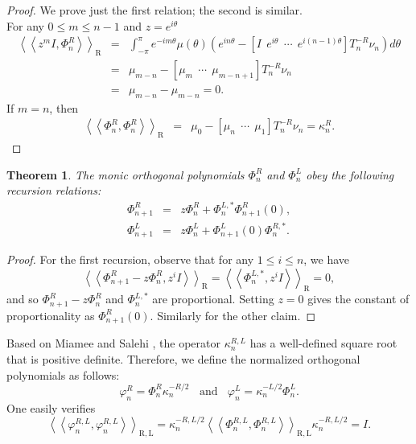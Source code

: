 \documentclass[11pt]{article}
\newtheorem{theorem}{Theorem}[section]
\begin{document}
\begin{proof}
We prove just the first relation; the second is similar.\\
\noindent For any $0 \leq m \leq n-1$ and $z=e^{i\theta}$
\begin{eqnarray*}
\left\langle \left\langle z^{m}I,\Phi_{n}^{R}\right\rangle\right\rangle_{\mathrm{R}} &=& 
\int_{-\pi}^{\pi}e^{-im\theta} \mu(\theta) 
(e^{i n \theta} - 
[I~~e^{i\theta}~~\cdots~~e^{i(n-1)\theta}]T^{-R}_{n}\nu_{n})d\theta\\
&=& \mu_{m-n} - [\mu_{m}~~\cdots~~\mu_{m-n+1}]T^{-R}_{n}\nu_{n}\\
&=& \mu_{m-n} - \mu_{m-n} = 0.
\end{eqnarray*}
If $m=n$, then 
\begin{eqnarray*}
\left\langle \left\langle \Phi_{n}^{R},\Phi_{n}^{R}\right\rangle\right\rangle_{\mathrm{R}} &=& 
\mu_{0} - [\mu_{n}~~\cdots~~\mu_{1}]T^{-R}_{n}\nu_{n} = \kappa_{n}^{R}.
\end{eqnarray*}
\end{proof}

\begin{theorem}
The monic orthogonal polynomials $\Phi^{R}_{n}$ and $\Phi^{L}_{n}$ obey the following recursion relations:
\begin{eqnarray} \label{monic_recursion}
\Phi_{n+1}^{R} &=& z \Phi_{n}^{R} + \Phi_{n}^{L,*} \Phi_{n+1}^{R}(0), \\
\Phi_{n+1}^{L} &=& z \Phi_{n}^{L} + \Phi_{n+1}^{L}(0) \Phi_{n}^{R,*}.
\end{eqnarray} 
\end{theorem}     
\begin{proof}
For the first recursion, observe that for any $1 \leq i \leq n$, we have 
$$\left\langle \left\langle \Phi_{n+1}^{R} - z \Phi_{n}^{R}, z^{i}I\right\rangle\right\rangle_{\mathrm{R}}= \left\langle \left\langle \Phi_{n}^{L,*}, z^{i}I\right\rangle\right\rangle_{\mathrm{R}} = 0,$$
and so $\Phi_{n+1}^{R} - z \Phi_{n}^{R}$ and $\Phi_{n}^{L,*}$ are proportional. Setting $z=0$ gives the constant of proportionality as $\Phi_{n+1}^{R}(0)$. 
 Similarly for the other claim.
 \end{proof} 
 
\noindent Based on Miamee and Salehi \cite{MiaS1}, the operator $\kappa^{R,L}_{n}$  has a well-defined square root that is positive definite. Therefore, we define the normalized orthogonal polynomials as follows:
$$
\varphi_{n}^{R} =\Phi_{n}^{R} \kappa^{-R/2}_{n}~~~~\mathrm{and}~~~~\varphi_{n}^{L} =\kappa^{-L/2}_{n} \Phi_{n}^{L}.
$$
\noindent One easily verifies 
$$
\left\langle \left\langle \varphi_{n}^{R,L},\varphi_{n}^{R,L} \right\rangle\right\rangle_{\mathrm{R,L}}=\kappa^{-R,L/2}_{n}\left\langle \left\langle \Phi_{n}^{R,L},\Phi_{n}^{R,L} \right\rangle\right\rangle_{\mathrm{R,L}}\kappa^{-R,L/2}_{n}=I.
$$
\end{document}
